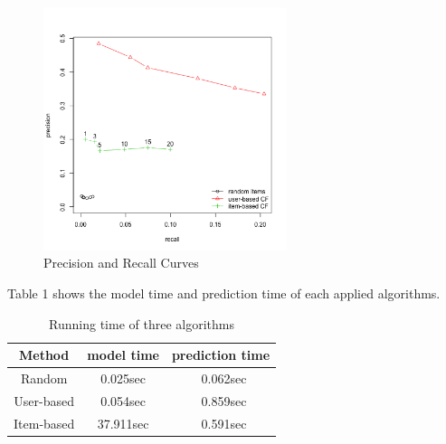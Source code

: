 \documentclass[conference]{IEEEtran}
\begin{document}
\begin{figure}
	\centering
	\includegraphics[width=2.8in]{precision_recall.png}
	\caption{Precision and Recall Curves}
	\label{fig:side:a}
\end{figure}

Table 1 shows the model time and prediction time of each applied algorithms.
\begin{table}
	\caption{Running time of three algorithms}
	\begin{center}
		\begin{tabular}{ccc}
			\hline
			\rule{0pt}{12pt}Method  & \rule{0pt}{12pt}model time   &\rule{0pt}{12pt} prediction time\\
			\hline\rule{0pt}{12pt}
			Random    &   0.025sec & \ 	0.062sec \\
			User-based  &   0.054sec & \ 	0.859sec\\
			Item-based  &   37.911sec & \      0.591sec\\
			\hline
		\end{tabular}
	\end{center}
\end{table}
%
%
\end{document}
